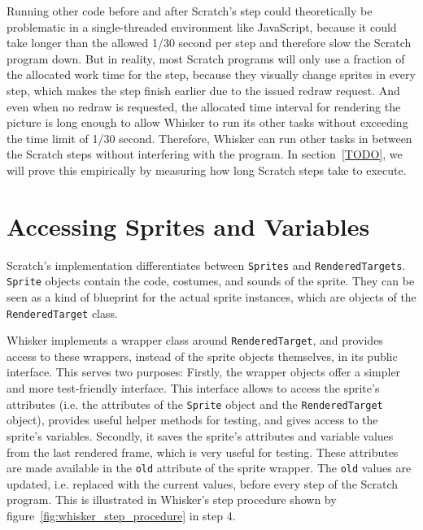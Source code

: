 Running other code before and after Scratch's step could theoretically be problematic in a single-threaded environment like JavaScript,
because it could take longer than the allowed 1/30 second per step and therefore slow the Scratch program down.
But in reality, most Scratch programs will only use a fraction of the allocated work time for the step,
because they visually change sprites in every step, which makes the step finish earlier due to the issued redraw request.
And even when no redraw is requested,
the allocated time interval for rendering the picture is long enough to allow Whisker to run its other tasks without exceeding the time limit of 1/30 second.
Therefore, Whisker can run other tasks in between the Scratch steps without interfering with the program.
In section~\ref{TODO}, we will prove this empirically by measuring how long Scratch steps take to execute.


\section{Accessing Sprites and Variables}

Scratch's implementation differentiates between \texttt{Sprites} and \texttt{RenderedTargets}.
\texttt{Sprite} objects contain the code, costumes, and sounds of the sprite.
They can be seen as a kind of blueprint for the actual sprite instances, which are objects of the \texttt{RenderedTarget} class.
\parspace

Whisker implements a wrapper class around \texttt{RenderedTarget},
and provides access to these wrappers, instead of the sprite objects themselves, in its public interface.
This serves two purposes:
Firstly, the wrapper objects offer a simpler and more test-friendly interface.
This interface allows to access the sprite's attributes (i.e. the attributes of the \texttt{Sprite} object and the \texttt{RenderedTarget} object),
provides useful helper methods for testing,
and gives access to the sprite's variables.
Secondly, it saves the sprite's attributes and variable values from the last rendered frame,
which is very useful for testing.
These attributes are made available in the \texttt{old} attribute of the sprite wrapper.
The \texttt{old} values are updated, i.e. replaced with the current values,
before every step of the Scratch program.
This is illustrated in Whisker's step procedure shown by figure~\ref{fig:whisker_step_procedure} in step 4.
\parspace

